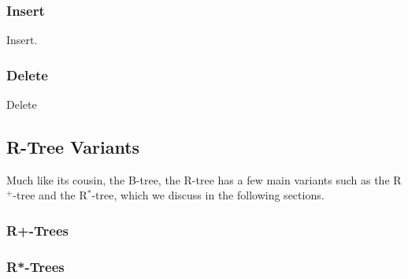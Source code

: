 \subsubsection{Insert}
Insert.
\subsubsection{Delete}
Delete

\subsection{R-Tree Variants}
\label{sec:variants}
Much like its cousin, the B-tree, the R-tree has a few main variants such as
the R$^{+}$-tree and the R$^{*}$-tree, which we discuss in the following sections.

\subsubsection{R+-Trees}
\subsubsection{R*-Trees}


